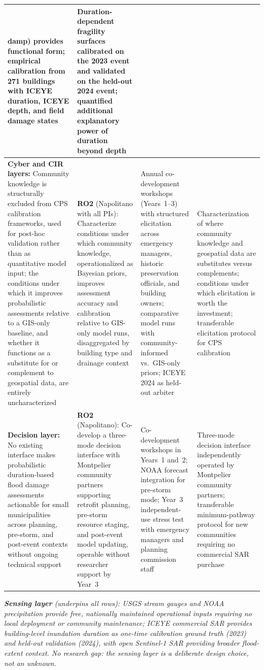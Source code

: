 \documentclass[11pt]{article}
\begin{document}
\begin{tabularx}{\textwidth}{|X|X|X|X|}
damp) provides functional form; empirical calibration from 271 buildings with ICEYE
duration, ICEYE depth, and field damage states &
Duration-dependent fragility surfaces calibrated on the 2023 event and validated
on the held-out 2024 event; quantified additional explanatory power of duration
beyond depth \\
\hline
\textbf{Cyber and CIR layers:} Community knowledge is structurally excluded from
CPS calibration frameworks, used for post-hoc validation rather than as quantitative
model input; the conditions under which it improves probabilistic assessments
relative to a GIS-only baseline, and whether it functions as a substitute for or
complement to geospatial data, are entirely uncharacterized &
\textbf{RO2} (Napolitano with all PIs): Characterize conditions under which community
knowledge, operationalized as Bayesian priors, improves assessment accuracy and
calibration relative to GIS-only model runs, disaggregated by building type and
drainage context &
Annual co-development workshops (Years~1--3) with structured elicitation across
emergency managers, historic preservation officials, and building owners;
comparative model runs with community-informed vs.\ GIS-only priors;
ICEYE 2024 as held-out arbiter &
Characterization of where community knowledge and geospatial data are substitutes
versus complements; conditions under which elicitation is worth the investment;
transferable elicitation protocol for CPS calibration \\
\hline
\textbf{Decision layer:} No existing interface makes probabilistic duration-based
flood damage assessments actionable for small municipalities across planning,
pre-storm, and post-event contexts without ongoing technical support &
\textbf{RO2} (Napolitano): Co-develop a three-mode decision interface with Montpelier
community partners supporting retrofit planning, pre-storm resource staging, and
post-event model updating, operable without researcher support by Year~3 &
Co-development workshops in Years~1 and~2; NOAA forecast integration for pre-storm
mode; Year~3 independent-use stress test with emergency managers and planning
commission staff &
Three-mode decision interface independently operated by Montpelier community partners;
transferable minimum-pathway protocol for new communities requiring no commercial SAR purchase \\
\end{tabularx}
\vspace{2pt}
\footnotesize\textit{\textbf{Sensing layer} (underpins all rows): USGS stream
gauges and NOAA precipitation provide free, nationally maintained operational
inputs requiring no local deployment or community maintenance; ICEYE commercial
SAR provides building-level inundation duration as one-time calibration ground
truth (2023) and held-out validation (2024), with open Sentinel-1 SAR providing
broader flood-extent context. No research gap: the sensing
layer is a deliberate design choice, not an unknown.}
\endgroup
\normalsize
\end{document}
